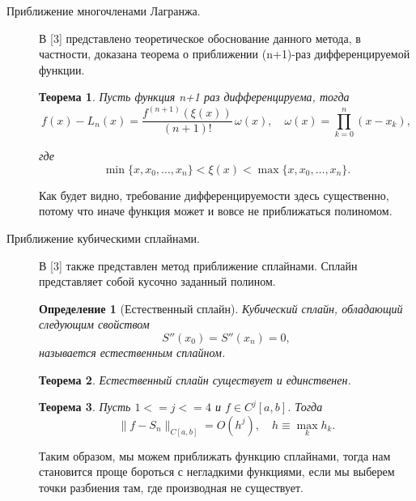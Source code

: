 \documentclass{article}
\newtheorem{theorem}{Теорема}
\newtheorem{definition}{Определение}[section]
\begin{document}
\begin{description}
    \item[Приближение многочленами Лагранжа.]

    В [3] представлено теоретическое обоснование данного метода, в частности, доказана теорема о приближении (n+1)-раз дифференцируемой функции.

    \begin{theorem}
        Пусть функция n+1 раз дифференцируема, тогда
        \begin{equation}
            f(x) - L_n(x) = \frac{f^{(n+1)}(\xi(x))}{(n+1)!} \, \omega(x), \quad \omega(x) = \prod_{k=0}^{n} (x - x_k),
            \label{eq:lagrange_error}
        \end{equation}

        где
        \begin{equation}
            \min\{x, x_0, \ldots, x_n\} < \xi(x) < \max\{x, x_0, \ldots, x_n\}.
            \label{eq:placeholder}
        \end{equation}
    \end{theorem}

    Как будет видно, требование дифференцируемости здесь существенно, потому что иначе функция может и вовсе не приближаться полиномом.

    \item[Приближение кубическими сплайнами.]

    В [3] также представлен метод приближение сплайнами. Сплайн представляет собой кусочно заданный полином.
    \begin{definition}[Естественный сплайн]
        Кубический сплайн, обладающий следующим свойством
        \begin{equation}
            S''(x_0) = S''(x_n) = 0,
            \label{eq:placeholder_label}
        \end{equation}
        называется естественным сплайном.
    \end{definition}    

    \begin{theorem}
        Естественный сплайн существует и единственен.
    \end{theorem}

    \begin{theorem}
        Пусть \(1 <= j <= 4\) и \(f \in C^j[a, b]\). Тогда
        \begin{equation}
            \|f - S_n\|_{C[a, b]} = O(h^j), \quad h \equiv \max_k h_k.
            \label{eq:example}
        \end{equation}
    \end{theorem}

    Таким образом, мы можем приближать функцию сплайнами, тогда нам становится проще бороться с негладкими функциями, если мы выберем точки разбиения там, где производная не существует.
\end{description}
\end{document}

